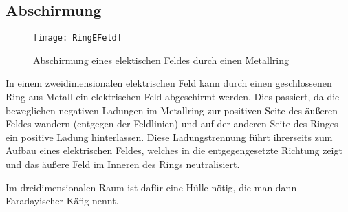 \subsection{Abschirmung}

\begin{figure}[!h]
	\centering
	\texttt{[image: RingEFeld]}
	\caption{Abschirmung eines elektischen Feldes durch einen Metallring}
	\label{fig:abschrimung}
\end{figure}

In einem zweidimensionalen elektrischen Feld kann durch einen geschlossenen Ring aus Metall ein elektrischen Feld abgeschirmt werden. Dies passiert, da die beweglichen negativen Ladungen im Metallring zur positiven Seite des äußeren Feldes wandern (entgegen der Feldlinien) und auf der anderen Seite des Ringes ein positive Ladung hinterlassen. Diese Ladungstrennung führt ihrerseits zum Aufbau eines elektrischen Feldes, welches in die entgegengesetzte Richtung zeigt und das \glqq äußere\grqq{} Feld im Inneren des Rings neutralisiert.

Im dreidimensionalen Raum ist dafür eine Hülle nötig, die man dann \glqq Faradayischer Käfig\grqq{} nennt.